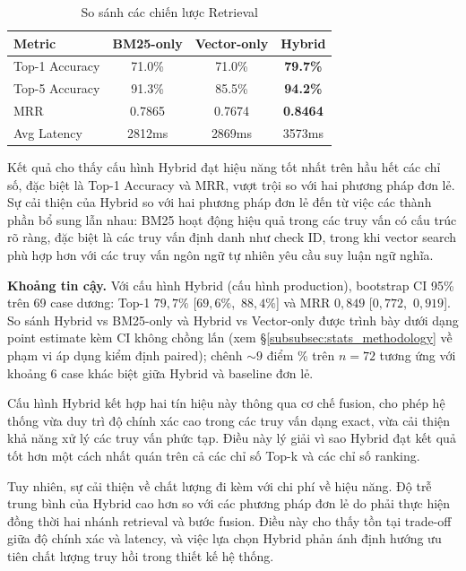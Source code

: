 \begin{table}[!htb]
\centering
\caption{So sánh các chiến lược Retrieval}
\label{tab:retrieval_ablation}
\begin{tabular}{lccc}
\toprule
Metric & BM25-only & Vector-only & Hybrid \\
\midrule
Top-1 Accuracy & 71.0\% & 71.0\% & \textbf{79.7\%} \\
Top-5 Accuracy & 91.3\% & 85.5\% & \textbf{94.2\%} \\
MRR & 0.7865 & 0.7674 & \textbf{0.8464} \\
Avg Latency & 2812ms & 2869ms & 3573ms \\
\bottomrule
\end{tabular}
\end{table}

Kết quả cho thấy cấu hình Hybrid đạt hiệu năng tốt nhất trên hầu hết các chỉ số, đặc biệt là Top-1 Accuracy và MRR, vượt trội so với hai phương pháp đơn lẻ. Sự cải thiện của Hybrid so với hai phương pháp đơn lẻ đến từ việc các thành phần bổ sung lẫn nhau: BM25 hoạt động hiệu quả trong các truy vấn có cấu trúc rõ ràng, đặc biệt là các truy vấn định danh như check ID, trong khi vector search phù hợp hơn với các truy vấn ngôn ngữ tự nhiên yêu cầu suy luận ngữ nghĩa.

\textbf{Khoảng tin cậy.} Với cấu hình Hybrid (cấu hình production), bootstrap CI 95\% trên 69 case dương: Top-1 $79{,}7\%$ \mbox{[$69{,}6\%$, $88{,}4\%$]} và MRR $0{,}849$ \mbox{[$0{,}772$, $0{,}919$]}. So sánh Hybrid vs BM25-only và Hybrid vs Vector-only được trình bày dưới dạng point estimate kèm CI không chồng lấn (xem \S\ref{subsubsec:stats_methodology} về phạm vi áp dụng kiểm định paired); chênh $\sim 9$ điểm \% trên $n=72$ tương ứng với khoảng 6 case khác biệt giữa Hybrid và baseline đơn lẻ.

Cấu hình Hybrid kết hợp hai tín hiệu này thông qua cơ chế fusion, cho phép hệ thống vừa duy trì độ chính xác cao trong các truy vấn dạng exact, vừa cải thiện khả năng xử lý các truy vấn phức tạp. Điều này lý giải vì sao Hybrid đạt kết quả tốt hơn một cách nhất quán trên cả các chỉ số Top-k và các chỉ số ranking.

Tuy nhiên, sự cải thiện về chất lượng đi kèm với chi phí về hiệu năng. Độ trễ trung bình của Hybrid cao hơn so với các phương pháp đơn lẻ do phải thực hiện đồng thời hai nhánh retrieval và bước fusion. Điều này cho thấy tồn tại trade-off giữa độ chính xác và latency, và việc lựa chọn Hybrid phản ánh định hướng ưu tiên chất lượng truy hồi trong thiết kế hệ thống.


